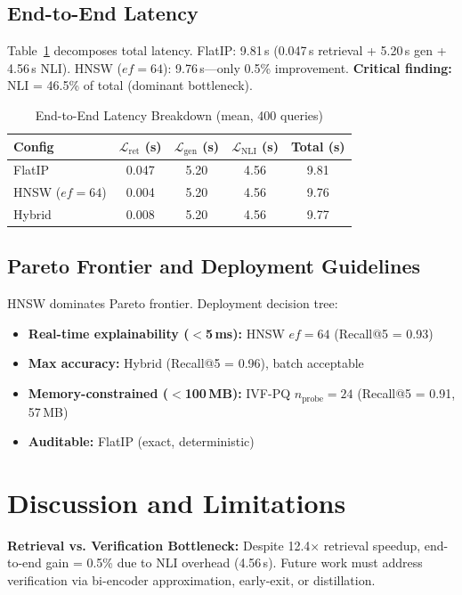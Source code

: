 \documentclass[conference]{IEEEtran}
\begin{document}
\subsection{End-to-End Latency}

Table~\ref{tab:e2e} decomposes total latency. FlatIP: 9.81\,s (0.047\,s retrieval + 5.20\,s gen + 4.56\,s NLI). HNSW ($ef=64$): 9.76\,s—only 0.5\% improvement. \textbf{Critical finding:} NLI = 46.5\% of total (dominant bottleneck).

\begin{table}[t]
\caption{End-to-End Latency Breakdown (mean, 400 queries)}
\label{tab:e2e}
\centering
\small
\begin{tabular}{@{}lcccc@{}}
\toprule
Config & $\mathcal{L}_{\text{ret}}$ (s) & $\mathcal{L}_{\text{gen}}$ (s) & $\mathcal{L}_{\text{NLI}}$ (s) & Total (s) \\
\midrule
FlatIP & 0.047 & 5.20 & 4.56 & 9.81 \\
HNSW ($ef{=}64$) & 0.004 & 5.20 & 4.56 & 9.76 \\
Hybrid & 0.008 & 5.20 & 4.56 & 9.77 \\
\bottomrule
\end{tabular}
\end{table}

\subsection{Pareto Frontier and Deployment Guidelines}

HNSW dominates Pareto frontier. Deployment decision tree:

\begin{itemize}
    \item \textbf{Real-time explainability ($<$5\,ms):} HNSW $ef=64$ (Recall@5 = 0.93)
    \item \textbf{Max accuracy:} Hybrid (Recall@5 = 0.96), batch acceptable
    \item \textbf{Memory-constrained ($<$100\,MB):} IVF-PQ $n_{\text{probe}}=24$ (Recall@5 = 0.91, 57\,MB)
    \item \textbf{Auditable:} FlatIP (exact, deterministic)
\end{itemize}

\section{Discussion and Limitations}

\textbf{Retrieval vs. Verification Bottleneck:} Despite 12.4$\times$ retrieval speedup, end-to-end gain = 0.5\% due to NLI overhead (4.56\,s). Future work must address verification via bi-encoder approximation, early-exit, or distillation.
\end{document}

